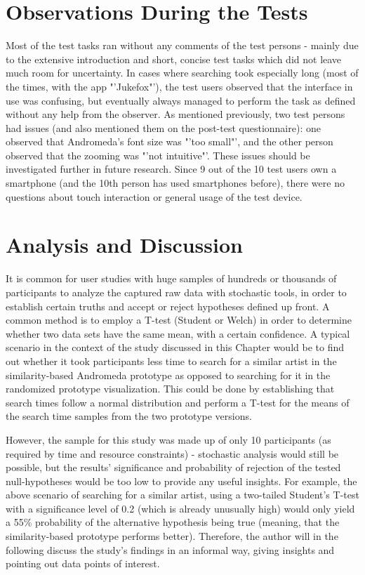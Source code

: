 \section{Observations During the Tests}

Most of the test tasks ran without any comments of the test persons - mainly due to the extensive introduction and short, concise test tasks which did not leave much room for uncertainty. In cases where searching took especially long (most of the times, with the app "'Jukefox"'), the test users observed that the interface in use was confusing, but eventually always managed to perform the task as defined without any help from the observer. As mentioned previously, two test persons had issues (and also mentioned them on the post-test questionnaire): one observed that Andromeda's font size was "'too small"', and the other person observed that the zooming was "'not intuitive"'. These issues should be investigated further in future research. Since 9 out of the 10 test users own a smartphone (and the 10th person has used smartphones before), there were no questions about touch interaction or general usage of the test device.

\section{Analysis and Discussion}

It is common for user studies with huge samples of hundreds or thousands of participants to analyze the captured raw data with stochastic tools, in order to establish certain truths and accept or reject hypotheses defined up front. A common method is to employ a T-test (Student or Welch) in order to determine whether two data sets have the same mean, with a certain confidence. A typical scenario in the context of the study discussed in this Chapter would be to find out whether it took participants less time to search for a similar artist in the similarity-based Andromeda prototype as opposed to searching for it in the randomized prototype visualization. This could be done by establishing that search times follow a normal distribution and perform a T-test for the means of the search time samples from the two prototype versions.

However, the sample for this study was made up of only 10 participants (as required by time and resource constraints) - stochastic analysis would still be possible, but the results' significance and probability of rejection of the tested null-hypotheses would be too low to provide any useful insights. For example, the above scenario of searching for a similar artist, using a two-tailed Student's T-test with a significance level of 0.2 (which is already unusually high) would only yield a 55\% probability of the alternative hypothesis being true (meaning, that the similarity-based prototype performs better). Therefore, the author will in the following discuss the study's findings in an informal way, giving insights and pointing out data points of interest.

